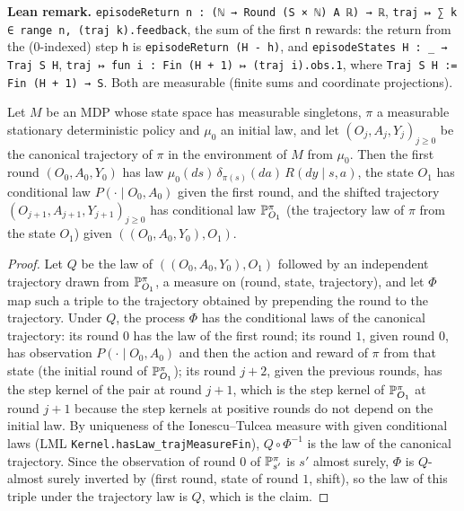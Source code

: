 \textbf{Lean remark.} \texttt{episodeReturn n : (ℕ → Round (S × ℕ) A ℝ) → ℝ},
\texttt{traj ↦ ∑ k ∈ range n, (traj k).feedback}, the sum of the first \texttt{n} rewards: the
return from the ($0$-indexed) step \texttt{h} is \texttt{episodeReturn (H - h)}, and
\texttt{episodeStates H : \_ → Traj S H}, \texttt{traj ↦ fun i : Fin (H + 1) ↦ (traj i).obs.1},
where \texttt{Traj S H := Fin (H + 1) → S}. Both are measurable (finite sums and coordinate
projections).

\begin{lemma}\label{lem:policy_markov}
\leanok
{}
Let $M$ be an MDP whose state space has measurable singletons, $\pi$ a measurable
stationary deterministic policy and $\mu_0$ an initial law, and let $(O_j, A_j, Y_j)_{j \ge 0}$ be
the canonical trajectory of $\pi$ in the environment of $M$ from $\mu_0$. Then the first round
$(O_0, A_0, Y_0)$ has law $\mu_0(ds)\,\delta_{\pi(s)}(da)\,R(dy \mid s, a)$, the state $O_1$ has
conditional law $P(\cdot \mid O_0, A_0)$ given the first round, and the shifted trajectory
$(O_{j+1}, A_{j+1}, Y_{j+1})_{j \ge 0}$ has conditional law $\mathbb{P}^\pi_{O_1}$ (the trajectory law of
$\pi$ from the state $O_1$) given $((O_0, A_0, Y_0), O_1)$.
\end{lemma}

\begin{proof}
\leanok
Let $Q$ be the law of $((O_0, A_0, Y_0), O_1)$ followed by an independent trajectory drawn from
$\mathbb{P}^\pi_{O_1}$, a measure on (round, state, trajectory), and let $\Phi$ map such a triple to the
trajectory obtained by prepending the round to the trajectory. Under $Q$, the process
$\Phi$ has the conditional laws of the canonical trajectory: its round $0$ has the law of the
first round; its round $1$, given round $0$, has observation $P(\cdot \mid O_0, A_0)$ and then the
action and reward of $\pi$ from that state (the initial round of $\mathbb{P}^\pi_{O_1}$); its round
$j + 2$, given the previous rounds, has the step kernel of the pair at round $j + 1$, which is the
step kernel of $\mathbb{P}^\pi_{O_1}$ at round $j + 1$ because the step kernels at positive rounds do
not depend on the initial law. By uniqueness of the Ionescu--Tulcea measure with given
conditional laws (LML \texttt{Kernel.hasLaw\_trajMeasureFin}), $Q \circ \Phi^{-1}$ is the law of
the canonical trajectory. Since the observation of round $0$ of $\mathbb{P}^\pi_{s'}$ is $s'$ almost
surely, $\Phi$ is $Q$-almost surely inverted by (first round, state of round $1$, shift), so the
law of this triple under the trajectory law is $Q$, which is the claim.
\end{proof}


